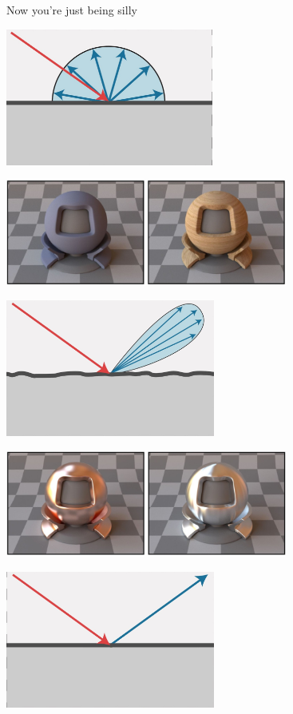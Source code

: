 \documentclass[9pt]{beamer}
\begin{document}
\begin{frame}{Now you're just being silly}
	\only<1> {
	\begin{center}
			\includegraphics[height=4.5cm]{slike/slide_043_cropped.jpg}
	\end{center}
	}
 {
	\begin{center}
		\includegraphics[height=3.5cm]{slike/slide_044_cropped.jpg}
	\end{center}
}
 {
	\begin{center}
		\includegraphics[height=4.5cm]{slike/slide_045_cropped.jpg}
	\end{center}
}
 {
	\begin{center}
		\includegraphics[height=3.5cm]{slike/slide_046_cropped.jpg}
	\end{center}
}
 {
	\begin{center}
		\includegraphics[height=4.5cm]{slike/slide_047_cropped.jpg}

\end{center}}
\end{frame}
\end{document}
